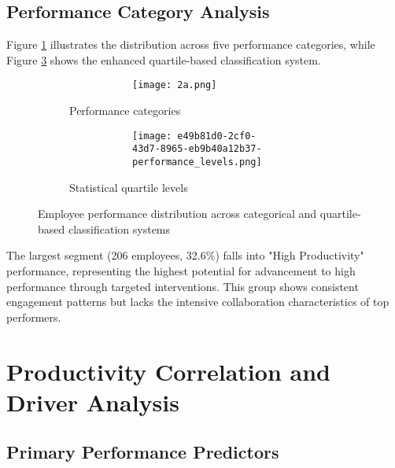 \documentclass[12pt,a4paper]{article}
\begin{document}
\subsection{Performance Category Analysis}

Figure \ref{fig:performance_categories} illustrates the distribution across five performance categories, while Figure \ref{fig:performance_levels} shows the enhanced quartile-based classification system.

\begin{figure}[H]
\centering
\begin{subfigure}{0.5\textwidth}
    \begin{figure}
        \centering
        \begin{figure}
            \centering
            \texttt{[image: 2a.png]}
        \end{figure}
    \end{figure}
    \caption{Performance categories}
    \label{fig:performance_categories}
\end{subfigure}
\hfill
\begin{subfigure}{0.48\textwidth}
\begin{figure}
        \centering
        \begin{figure}
            \centering
            \texttt{[image: e49b81d0-2cf0-43d7-8965-eb9b40a12b37-performance\_levels.png]}
        \end{figure}
    \end{figure}
        \caption{Statistical quartile levels}
    \label{fig:performance_levels}
\end{subfigure}
\caption{Employee performance distribution across categorical and quartile-based classification systems}
\end{figure}

The largest segment (206 employees, 32.6\%) falls into "High Productivity" performance, representing the highest potential for advancement to high performance through targeted interventions. This group shows consistent engagement patterns but lacks the intensive collaboration characteristics of top performers.


\newpage
\section{Productivity Correlation and Driver Analysis}

\subsection{Primary Performance Predictors}
\end{document}
